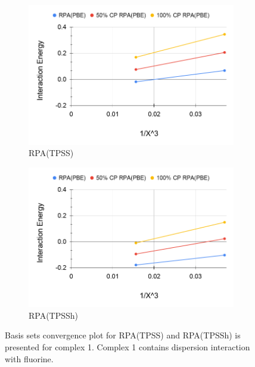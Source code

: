 \documentclass[11pt]{article}
\begin{document}
\begin{figure}[hbpt]
  \centering
  \begin{subfigure}{.5\textwidth}
    \centering
    \includegraphics[scale=0.3]{tpss-1.png}
    \caption{RPA(TPSS)}
    \label{fig:tpss_1}
  \end{subfigure}%
  \begin{subfigure}{.5\textwidth}
    \centering
    \includegraphics[scale=0.3]{tpssh-1.png}
    \caption{RPA(TPSSh)}
    \label{fig:tpssh_1}
  \end{subfigure}
  \caption{Basis sets convergence plot for RPA(TPSS) and RPA(TPSSh) is
    presented for complex 1. Complex 1 contains dispersion interaction
    with fluorine.}
  \label{fig:complex_1}
\end{figure}
\end{document}
